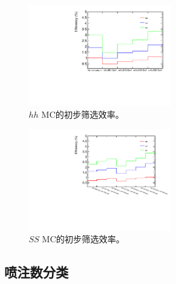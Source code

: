 \begin{figure}
\centering
\includegraphics[width=0.55\textwidth, angle =-90]{fig/SigTopo/eff_presel_hh.pdf}
\caption{$hh$ MC的初步筛选效率。}
\label{fig:eff_pre_sel_hh}
\end{figure}

\begin{figure}
\centering
\includegraphics[width=0.55\textwidth, angle =-90]{fig/SigTopo/eff_presel_SS.pdf}
\caption{$SS$ MC的初步筛选效率。}
\label{fig:eff_pre_sel_SS}
\end{figure}

\subsection{喷注数分类}
